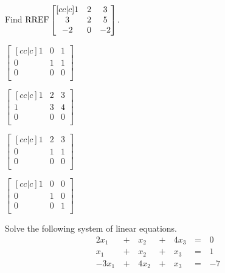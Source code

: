 \documentclass{article}
\begin{document}
\begin{readinessAssuranceTest}
\item Find
  \(\operatorname{RREF}
    \begin{bmatrix}[cc|c]
      1 & 2 & 3 \\
      3 & 2 & 5 \\
      -2 & 0 & -2 \\
    \end{bmatrix}
  \).
  \begin{multicols}{4}
  \begin{readinessAssuranceTestChoices}
  \item
    \(
      \begin{bmatrix}[cc|c]
        1 & 0 & 1 \\
        0 & 1 & 1 \\
        0 & 0 & 0 \\
      \end{bmatrix}
    \) %
  \item
    \(
      \begin{bmatrix}[cc|c]
        1 & 2 & 3 \\
        1 & 3 & 4 \\
        0 & 0 & 0 \\
      \end{bmatrix}
    \)
  \item
    \(
      \begin{bmatrix}[cc|c]
        1 & 2 & 3 \\
        0 & 1 & 1 \\
        0 & 0 & 0 \\
      \end{bmatrix}
    \)
  \item
    \(
      \begin{bmatrix}[cc|c]
        1 & 0 & 0 \\
        0 & 1 & 0 \\
        0 & 0 & 1 \\
      \end{bmatrix}
    \) %
  \end{readinessAssuranceTestChoices}
  \end{multicols}


  \item Solve the following system of linear equations.
  \begin{alignat*}{4}
    2x_1 &\,+\,& x_2 &\,+\,& 4x_3 &\,=\,& 0 \\
     x_1 &\,+\,& x_2 &\,+\,&  x_3 &\,=\,& 1 \\
   -3x_1 &\,+\,& 4x_2 &\,+\,& x_3 &\,=\,& -7 \\
  \end{alignat*}


\end{readinessAssuranceTest}
\end{document}
